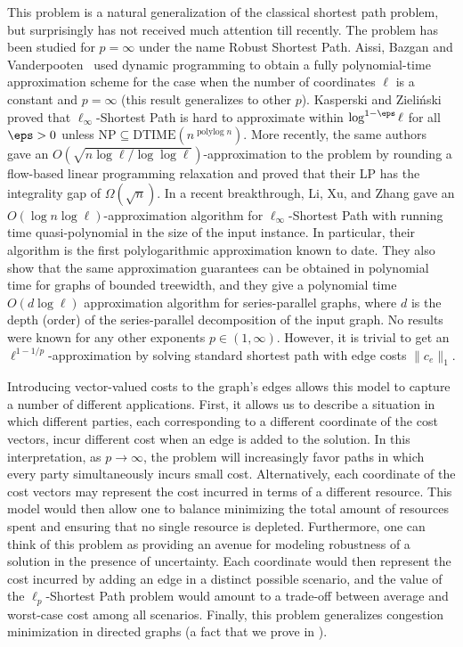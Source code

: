 \documentclass[11pt,a4paper]{article}
\begin{document}
This problem is a natural generalization of the classical shortest path problem, but surprisingly has not received much attention till recently. 
The problem has been studied for $p=\infty$ under the name Robust Shortest Path. 
Aissi, Bazgan and Vanderpooten~\cite{aissi2007approximation} used dynamic programming to obtain a fully polynomial-time approximation scheme for the case when the number of coordinates $\ell$ is a constant and $p=\infty$ (this result generalizes to other $p$). Kasperski and Zieli\'nski~\cite{kasperski2009approximability} proved that $\ell_\infty$-Shortest Path is hard to approximate within $\log^{1-\eps} \ell$ for all \(\eps > 0\) unless $\mathrm{NP} \subseteq \mathrm{DTIME}(n^{\operatorname{polylog} n})$.
More recently, the same authors~\cite{kasperski2018approximating} gave an $O(\sqrt{n \log \ell / \log\log \ell})$-approximation to the problem by rounding a flow-based linear programming relaxation and proved that their LP has the integrality gap of $\Omega(\sqrt{n})$. In a recent breakthrough, Li, Xu, and Zhang \cite{li2023polylogarithmic} gave an $O(\log n \log \ell)$-approximation algorithm for $\ell_{\infty}$-Shortest Path with running time quasi-polynomial in the size of the input instance. In particular, their algorithm is the first polylogarithmic approximation known to date. They also show that the same approximation guarantees can be obtained in polynomial time for graphs of bounded treewidth, and they give a polynomial time $O(d \log \ell)$ approximation algorithm for series-parallel graphs, where $d$ is the depth (order) of the series-parallel decomposition of the input graph. No results were known for any other exponents $p\in(1,\infty)$. However, it is trivial to get an $\ell^{1-1/p}$-approximation by solving standard shortest path with edge costs $\|c_e\|_1$.

Introducing vector-valued costs to the graph's edges allows this model to capture a number of different applications. First, it allows us to describe a situation in which different parties, each corresponding to a different coordinate of the cost vectors, incur different cost when an edge is added to the solution. 
In this interpretation, as $p \to \infty$, the problem will increasingly favor paths in which every party simultaneously incurs small cost. Alternatively, each coordinate of the cost vectors may represent the cost incurred in terms of a different resource. This model would then allow one to balance minimizing the total amount of resources spent and ensuring that no single resource is depleted. Furthermore, one can think of this problem as providing an avenue for modeling robustness of a solution in the presence of uncertainty. Each coordinate would then represent the cost incurred by adding an edge in a distinct possible scenario, and the value of the $\ell_p$-Shortest Path problem would amount to a trade-off between average and worst-case cost among all scenarios. Finally, this problem generalizes congestion minimization in directed graphs (a fact that we prove in ).
\end{document}
